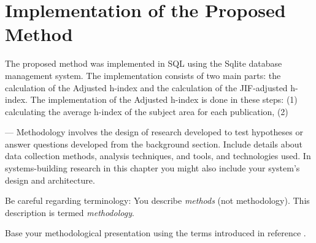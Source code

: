 \section{Implementation of the Proposed Method}

The proposed method was implemented in SQL using the Sqlite database management
system. The implementation consists of two main parts: the calculation of the
Adjusted h-index and the calculation of the JIF-adjusted h-index. The
implementation of the Adjusted h-index is done in these steps: (1)
calculating the average h-index of the subject area for each publication, (2)



---
Methodology involves the design of research developed to test hypotheses or
answer questions developed from the background section. Include details about
data collection methods, analysis techniques, and tools, and technologies used.
In systems-building research in this chapter you might also include your
system's design and architecture.

Be careful regarding terminology: You describe \emph{methods} (not
methodology). This description is termed \emph{methodology}.

Base your methodological presentation using the terms introduced in reference
\cite{SF18}.

